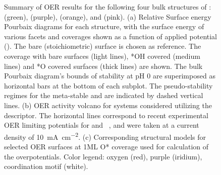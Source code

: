 \begin{figure}
\centering
{}
\caption{\label{fig:oer_volcano}
%
Summary of OER results for the following four bulk structures of \IrOx: \rIrOtwo (green), \aIrOthree (purple), \rIrOthree (orange), and \bIrOthree (pink).
%
(a) Relative Surface energy Pourbaix diagrams for each structure, with the surface energy of various facets and coverages shown as a function of applied potential (\VRHE). The bare (stoichiometric) surface is chosen as reference. 
%
The coverage with bare surfaces (light lines), *OH covered  (medium lines) and *O covered surfaces (thick lines) are shown.
%
The bulk Pourbaix diagram's bounds of stability at pH \num{0} are superimposed as horizontal bars at the bottom of each subplot.
%
The pseudo-stability regimes for the meta-stable \bIrOthree and \rIrOthree are indicated by dashed vertical lines.
%
(b) OER activity volcano for \IrOx systems considered utilizing the \DGOmOH descriptor.
%
The horizontal lines correspond to recent experimental OER limiting potentials for \IrOtwo and \IrOthree~\cite{Seitz2016}, and were taken at a current density of \SI[mode=text]{10}{\mA\per\cm\squared}.
%
(c) Corresponding structural models for selected OER surfaces at 1ML O* coverage used for calculation of the overpotentials. 
%
%
Color legend: oxygen (red), purple (iridium), coordination motif (white).
}
\end{figure}
